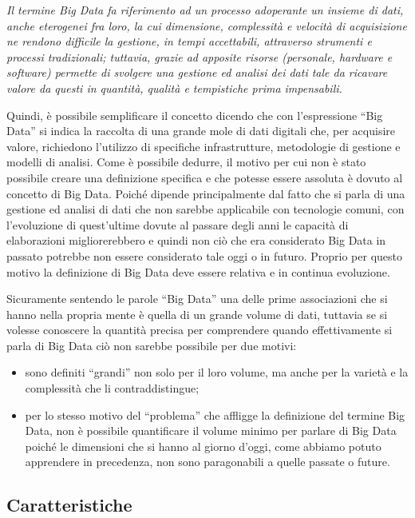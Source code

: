 \begin{center}
\textit{Il termine Big Data fa riferimento ad un processo adoperante un insieme di dati, anche eterogenei fra loro, la cui dimensione, complessità e velocità di acquisizione ne rendono difficile la gestione, in tempi accettabili, attraverso strumenti e processi tradizionali; tuttavia, grazie ad apposite risorse (personale, hardware e software) permette di svolgere una gestione ed analisi dei dati tale da ricavare valore da questi in quantità, qualità e tempistiche prima impensabili.}
\end{center}

Quindi, è possibile semplificare il concetto dicendo che con l’espressione “Big Data” si indica la raccolta di una grande mole di dati digitali che, per acquisire valore, richiedono l’utilizzo di specifiche infrastrutture, metodologie di gestione e modelli di analisi. Come è possibile dedurre, il motivo per cui non è stato possibile creare una definizione specifica e che potesse essere assoluta è dovuto al concetto di Big Data. Poiché dipende principalmente dal fatto che si parla di una gestione ed analisi di dati che non sarebbe applicabile con tecnologie comuni, con l’evoluzione di quest’ultime dovute al passare degli anni le capacità di elaborazioni migliorerebbero e quindi non ciò che era considerato Big Data in passato potrebbe non essere considerato tale oggi o in futuro. Proprio per questo motivo la definizione di Big Data deve essere relativa e in continua evoluzione.

Sicuramente sentendo le parole “Big Data” una delle prime associazioni che si hanno nella propria mente è quella di un grande volume di dati, tuttavia se si volesse conoscere la quantità precisa per comprendere quando effettivamente si parla di Big Data ciò non sarebbe possibile per due motivi:

\begin{itemize}
    \item sono definiti “grandi” non solo per il loro volume, ma anche per la varietà e la complessità che li contraddistingue;
    \item per lo stesso motivo del “problema” che affligge la definizione del termine Big Data, non è possibile quantificare il volume minimo per parlare di Big Data poiché le dimensioni che si hanno al giorno d’oggi, come abbiamo potuto apprendere in precedenza, non sono paragonabili a quelle passate o future.
\end{itemize}

\subsection{Caratteristiche}

